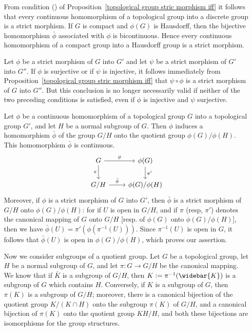 \begin{example}
From condition () of Proposition~\ref{topological group stric morphism iff} it follows that every continuous homomorphism of a topological group into a discrete group is
a strict morphism. If $G$ is compact and $\phi(G)$ is Hausdorff, then the bijective homomorphism $\bar{\phi}$ associated with $\phi$ is bicontinuous. Hence every continuous homomorphism of a compact group into a Hausdorff group is a strict morphism.
\end{example}
\begin{example}
Let $\phi$ be a strict morphism of $G$ into $G'$ and let $\psi$ be a strict morphism of $G'$ into $G''$. If $\phi$ is surjective or if $\psi$ is injective, it follows immediately from Proposition~\ref{topological group stric morphism iff} that $\psi\circ\phi$ is a strict morphism of $G$ into $G''$. But this conclusion is no longer necessarily valid if neither of the two preceding conditions is satisfied, even if $\phi$ is injective and $\psi$ surjective.
\end{example}
\begin{example}\label{topological group stric morphism hereditary on quotient}
Let $\phi$ be a continuous homomorphism of a topological group $G$ into a topological group $G'$, and let $H$ be a normal subgroup of $G$. Then $\phi$ induces a homomorphism $\bar{\phi}$ of the group $G/H$ onto the quotient group $\phi(G)/\phi(H)$. This homomorphism $\bar{\phi}$ is continuous.
\[\begin{tikzcd}
G\ar[r,"\phi"]\ar[d,swap,"\pi"]&\phi(G)\ar[d,"\pi'"]\\
G/H\ar[r,"\bar{\phi}"]&\phi(G)/\phi(H)
\end{tikzcd}\]
Moreover, if $\phi$ is a strict morphism of $G$ into $G'$, then $\bar{\phi}$ is a strict morphism of $G/H$ onto $\phi(G)/\phi(H)$: for if $U$ is open in $G/H$, and if $\pi$ (resp, $\pi'$) denotes the canonical mapping of $G$ onto $G/H$ [resp. of $\phi(G)$ onto $\phi(G)/\phi(H)$], then we have $\bar{\phi}(U)=\pi'(\phi(\pi^{-1}(U)))$. Since $\pi^{-1}(U)$ is open in $G$, it follows that $\bar{\phi}(U)$ is open in $\phi(G)/\phi(H)$, which proves our assertion.
\end{example}
Now we consider subgroups of a quotient group. Let $G$ be a topological group, let $H$ be a normal subgroup of $G$, and let $\pi:G\to G/H$ be the canonical mapping. We know that if $\bar{K}$ is a subgroup of $G/H$, then $K:=\pi^{-1}(\widebar{K})$ is a subgroup of $G$ which contains $H$. Conversely, if $K$ is a subgroup of $G$, then $\pi(K)$ is a subgroup of $G/H$; moreover, there is a canonical bijection of the quotient group $K/(K\cap H)$ onto the subgroup $\pi(K)$ of $G/H$, and a canonical bijection of $\pi(K)$ onto the quotient group $KH/H$, and both these bijections are isomorphisms for the group structures.
